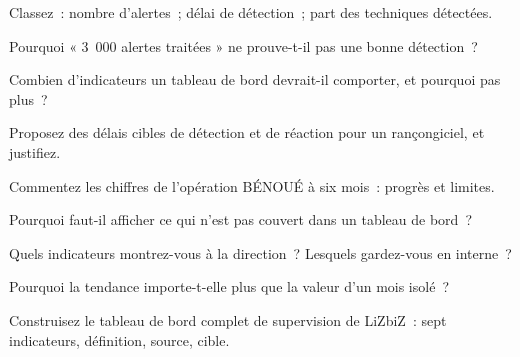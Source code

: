 \bigskip

\begin{boxexo}[title={\ding{45}\quad Exercice~3.1. Familles \niveaubase}]
Classez~: nombre d'alertes~; délai de détection~; part des techniques
détectées.
\end{boxexo}

\begin{boxexo}[title={\ding{45}\quad Exercice~3.2. Activité trompeuse \niveaubase}]
Pourquoi « 3~000 alertes traitées » ne prouve-t-il pas une bonne détection~?
\end{boxexo}

\begin{boxexo}[title={\ding{45}\quad Exercice~3.3. Combien \niveaubase}]
Combien d'indicateurs un tableau de bord devrait-il comporter, et pourquoi
pas plus~?
\end{boxexo}

\begin{boxexo}[title={\ding{45}\quad Exercice~3.4. Cibles \niveaumoyen}]
Proposez des délais cibles de détection et de réaction pour un rançongiciel,
et justifiez.
\end{boxexo}

\begin{boxexo}[title={\ding{45}\quad Exercice~3.5. Lire BÉNOUÉ \niveaumoyen}]
Commentez les chiffres de l'opération BÉNOUÉ à six mois~: progrès et limites.
\end{boxexo}

\begin{boxexo}[title={\ding{45}\quad Exercice~3.6. Angles morts \niveaumoyen}]
Pourquoi faut-il afficher ce qui n'est pas couvert dans un tableau de bord~?
\end{boxexo}

\begin{boxexo}[title={\ding{45}\quad Exercice~3.7. Deux lecteurs \niveaumoyen}]
Quels indicateurs montrez-vous à la direction~? Lesquels gardez-vous en
interne~?
\end{boxexo}

\begin{boxexo}[title={\ding{45}\quad Exercice~3.8. Tendance \niveaumoyen}]
Pourquoi la tendance importe-t-elle plus que la valeur d'un mois isolé~?
\end{boxexo}

\begin{boxexo}[title={\ding{45}\quad Exercice~3.9. Tableau de bord \niveauexpert}]
Construisez le tableau de bord complet de supervision de LiZbiZ~: sept
indicateurs, définition, source, cible.
\end{boxexo}

